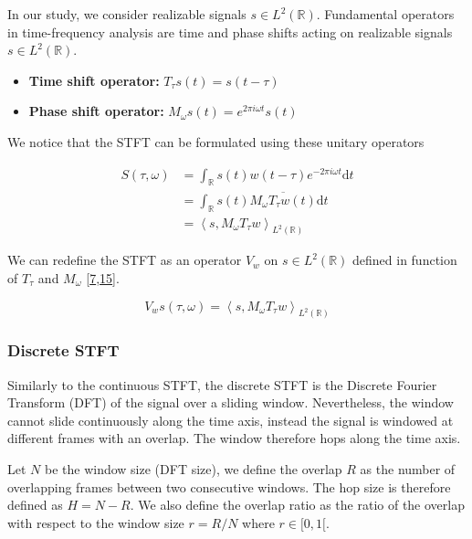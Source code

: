 \documentclass[
  american,
]{article}
\providecommand{\tightlist}{%
  \setlength{\itemsep}{0pt}\setlength{\parskip}{0pt}}
\begin{document}
In our study, we consider realizable signals \(s\in L^2(\mathbb{R})\).
Fundamental operators in time-frequency analysis are
time and phase shifts acting on realizable signals \(s\in L^2(\mathbb{R})\).

\begin{itemize}
\tightlist
\item
  \textbf{Time shift operator:} \(T_\tau s(t)=s(t-\tau)\)
\item
  \textbf{Phase shift operator:} \(M_\omega s(t)=e^{2\pi i \omega t} s(t)\)
\end{itemize}

We notice that the STFT can be formulated using these unitary operators

\begin{align}
S(\tau,\omega) &= \int_\mathbb{R}s(t)w(t-\tau)e^{-2\pi i\omega t} \mathrm{d}t\\
    &= \int_\mathbb{R}s(t) \overline{M_\omega T_\tau w(t)} \mathrm{d}t\\
    &= \left\langle s, M_\omega T_\tau w\right\rangle_{L^2(\mathbb{R})}
\end{align}

We can redefine the STFT as an operator \(V_w\) on \(s\in L^2(\mathbb{R})\)
defined in function of \(T_\tau\) and \(M_\omega\) {[}\protect\hyperlink{ref-boscain2021}{7},\protect\hyperlink{ref-grochenig2001}{15}{]}.

\begin{equation}\label{eq:stft_operator}
V_w s(\tau,\omega) = \left\langle s, M_\omega T_\tau w\right\rangle_{L^2(\mathbb{R})}
\end{equation}

\hypertarget{discrete-stft}{%
\subsubsection{Discrete STFT}\label{discrete-stft}}

Similarly to the continuous STFT, the discrete STFT is the
Discrete Fourier Transform (DFT) of the signal over a sliding window.
Nevertheless, the window cannot slide continuously along the time axis,
instead the signal is windowed at different frames with an overlap.
The window therefore hops along the time axis.

Let \(N\) be the window size (DFT size), we define the overlap \(R\)
as the number of overlapping frames between two consecutive windows.
The hop size is therefore defined as \(H=N-R\).
We also define the overlap ratio as the ratio of the overlap
with respect to the window size \(r=R/N\) where \(r\in[0,1[\).
\end{document}
